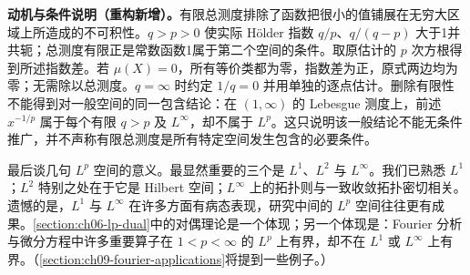 \documentclass[../../main.tex]{subfiles}
\begin{document}
\begin{remark}
\textbf{动机与条件说明（重构新增）。}有限总测度排除了函数把很小的值铺展在无穷大区域上所造成的不可积性。$q>p>0$ 使实际 Hölder 指数 $q/p$、$q/(q-p)$ 大于1并共轭；总测度有限正是常数函数1属于第二个空间的条件。取原估计的 $p$ 次方根得到所述指数差。若 $\mu(X)=0$，所有等价类都为零，指数差为正，原式两边均为零；无需除以总测度。$q=\infty$ 时约定 $1/q=0$ 并用单独的逐点估计。删除有限性不能得到对一般空间的同一包含结论：在 $(1,\infty)$ 的 Lebesgue 测度上，前述 $x^{-1/p}$ 属于每个有限 $q>p$ 及 $L^\infty$，却不属于 $L^p$。这只说明该一般结论不能无条件推广，并不声称有限总测度是所有特定空间发生包含的必要条件。
\end{remark}
最后谈几句 $L^p$ 空间的意义。最显然重要的三个是 $L^1$、$L^2$ 与 $L^\infty$。我们已熟悉 $L^1$；$L^2$ 特别之处在于它是 Hilbert 空间；$L^\infty$ 上的拓扑则与一致收敛拓扑密切相关。遗憾的是，$L^1$ 与 $L^\infty$ 在许多方面有病态表现，研究中间的 $L^p$ 空间往往更有成果。\cref{section:ch06-lp-dual}中的对偶理论是一个体现；另一个体现是：Fourier 分析与微分方程中许多重要算子在 $1<p<\infty$ 的 $L^p$ 上有界，却不在 $L^1$ 或 $L^\infty$ 上有界。（\cref{section:ch09-fourier-applications}将提到一些例子。）

\end{document}
